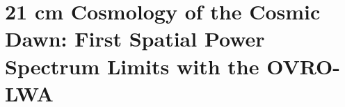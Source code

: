 \chapter{21 cm Cosmology of the Cosmic Dawn: First Spatial Power Spectrum Limits with the OVRO-LWA}
\label{chapter4}



